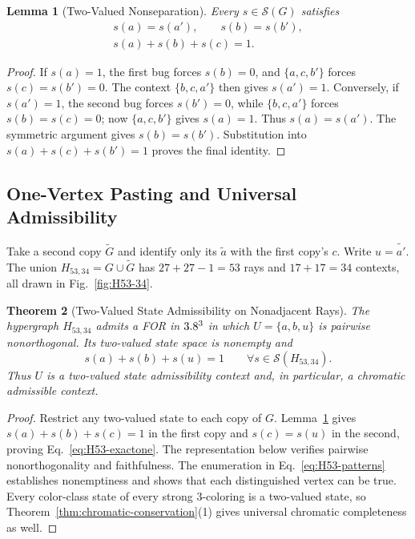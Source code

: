 \documentclass[aps,pra,reprint,superscriptaddress,longbibliography,nofootinbib,floatfix,10pt]{revtex4-2}
\newtheorem{theorem}{Theorem}
\newtheorem{lemma}[theorem]{Lemma}
\theoremstyle{definition}\newtheorem{definition}[theorem]{Definition}
\theoremstyle{remark}\newtheorem{remark}[theorem]{Remark}
\newcommand{\Sc}{\mathcal S}\newcommand{\Cc}{\mathcal C}\newcommand{\Wc}{\mathcal W}
\begin{document}
\begin{lemma}[Two-Valued Nonseparation]\label{lem:H53-nonseparation}
Every $s\in\Sc(G)$ satisfies
\begin{equation}\label{eq:H53-nonseparation}
\begin{gathered}
s(a)=s(a'),\qquad s(b)=s(b'),\\
s(a)+s(b)+s(c)=1.
\end{gathered}
\end{equation}
\end{lemma}
\begin{proof}
If $s(a)=1$, the first bug forces $s(b)=0$, and $\{a,c,b'\}$ forces $s(c)=s(b')=0$. The context $\{b,c,a'\}$ then gives $s(a')=1$. Conversely, if $s(a')=1$, the second bug forces $s(b')=0$, while $\{b,c,a'\}$ forces $s(b)=s(c)=0$; now $\{a,c,b'\}$ gives $s(a)=1$. Thus $s(a)=s(a')$. The symmetric argument gives $s(b)=s(b')$. Substitution into $s(a)+s(c)+s(b')=1$ proves the final identity.
\end{proof}

\subsection{One-Vertex Pasting and Universal Admissibility}

Take a second copy $\widetilde G$ and identify only its $\widetilde a$ with the first copy's $c$. Write $u=\widetilde{a'}$. The union $H_{53,34}=G\cup\widetilde G$ has $27+27-1=53$ rays and $17+17=34$ contexts, all drawn in Fig.~\ref{fig:H53-34}.

\begin{theorem}[Two-Valued State Admissibility on Nonadjacent Rays]\label{thm:H53-two-valued}
The hypergraph $H_{53,34}$ admits a FOR in $3.8^3$ in which $U=\{a,b,u\}$ is pairwise nonorthogonal. Its two-valued state space is nonempty and
\begin{equation}\label{eq:H53-exactone}
s(a)+s(b)+s(u)=1\qquad\forall s\in\Sc(H_{53,34}).
\end{equation}
Thus $U$ is a two-valued state admissibility context and, in particular, a chromatic admissible context.
\end{theorem}
\begin{proof}
Restrict any two-valued state to each copy of $G$. Lemma~\ref{lem:H53-nonseparation} gives $s(a)+s(b)+s(c)=1$ in the first copy and $s(c)=s(u)$ in the second, proving Eq.~\eqref{eq:H53-exactone}. The representation below verifies pairwise nonorthogonality and faithfulness. The enumeration in Eq.~\eqref{eq:H53-patterns} establishes nonemptiness and shows that each distinguished vertex can be true. Every color-class state of every strong $3$-coloring is a two-valued state, so Theorem~\ref{thm:chromatic-conservation}(1) gives universal chromatic completeness as well.
\end{proof}
\end{document}
